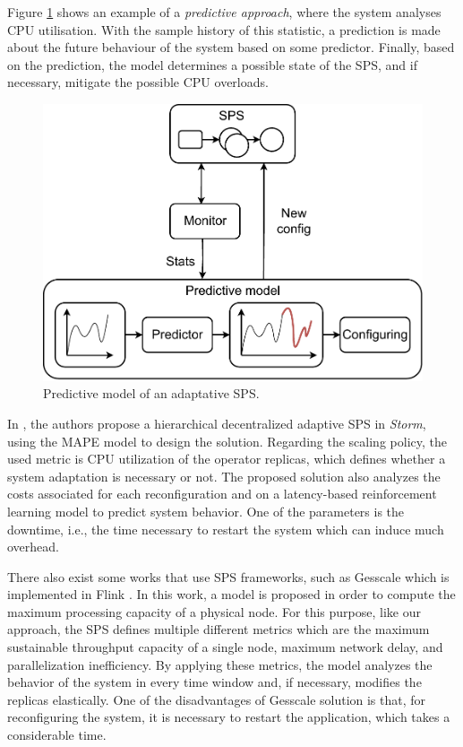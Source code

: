 Figure \ref{fig:rw-predictive} shows an example of a \textit{predictive approach}, where the system analyses CPU utilisation. With the sample history of this statistic, a prediction is made about the future behaviour of the system based on some predictor. Finally, based on the prediction, the model determines a possible state of the SPS, and if necessary, mitigate the possible CPU overloads.

\begin{figure}[!ht]
	\centering
	\includegraphics[scale=0.7]{figures/concepts/RW-Predictive.pdf}
	\caption{Predictive model of an adaptative SPS.}
	\label{fig:rw-predictive}
\end{figure}

In \cite{CardelliniPNR18}, the authors  propose a hierarchical decentralized adaptive SPS in \textit{Storm}, using the MAPE model to design the solution. Regarding the scaling policy, the used metric is CPU utilization of the operator replicas, which defines whether a system adaptation is necessary or not. 
The proposed solution also analyzes the costs associated for each reconfiguration and on a latency-based reinforcement learning model to predict system behavior. One of the parameters is the downtime, i.e., the time necessary to restart the system which can induce much overhead. %

There also exist some works that use SPS frameworks, such as Gesscale which is implemented in Flink \cite{arkian2021model}. In this work, a model is proposed in order to compute the maximum processing capacity of a physical node. For this purpose, like our approach, the SPS defines multiple different metrics which are the maximum sustainable throughput capacity of a single node, maximum network delay, and parallelization inefficiency. By applying these metrics, the model analyzes the behavior of the system in every time window and, if necessary, modifies the replicas elastically. One of the disadvantages of Gesscale solution is that, for reconfiguring the system, it is necessary to restart the application, which takes a considerable time.

